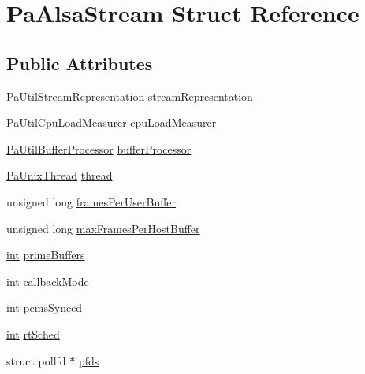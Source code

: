 \hypertarget{struct_pa_alsa_stream}{}\section{Pa\+Alsa\+Stream Struct Reference}
\label{struct_pa_alsa_stream}
\subsection*{Public Attributes}
\begin{DoxyCompactItemize}
\item 
\hyperlink{struct_pa_util_stream_representation}{Pa\+Util\+Stream\+Representation} \hyperlink{struct_pa_alsa_stream_addaeac8fe364c5ff592d34c51102490f}{stream\+Representation}
\item 
\hyperlink{struct_pa_util_cpu_load_measurer}{Pa\+Util\+Cpu\+Load\+Measurer} \hyperlink{struct_pa_alsa_stream_a29f7550cda202836040ec8d6dd0d6aea}{cpu\+Load\+Measurer}
\item 
\hyperlink{struct_pa_util_buffer_processor}{Pa\+Util\+Buffer\+Processor} \hyperlink{struct_pa_alsa_stream_acd44698cd6e3508f0d41c877ba5b436a}{buffer\+Processor}
\item 
\hyperlink{struct_pa_unix_thread}{Pa\+Unix\+Thread} \hyperlink{struct_pa_alsa_stream_a78a3ab135792aa210042183dabab28ca}{thread}
\item 
unsigned long \hyperlink{struct_pa_alsa_stream_a02214e72205abdc3e8cc0564c2e5a8e6}{frames\+Per\+User\+Buffer}
\item 
unsigned long \hyperlink{struct_pa_alsa_stream_a975c6b88b478a9408d81e84de435369f}{max\+Frames\+Per\+Host\+Buffer}
\item 
\hyperlink{xmltok_8h_a5a0d4a5641ce434f1d23533f2b2e6653}{int} \hyperlink{struct_pa_alsa_stream_a6977d63a92f8a3e044a8c6f5e1a2cc31}{prime\+Buffers}
\item 
\hyperlink{xmltok_8h_a5a0d4a5641ce434f1d23533f2b2e6653}{int} \hyperlink{struct_pa_alsa_stream_ad122ee597668cb143bc79be9712f382e}{callback\+Mode}
\item 
\hyperlink{xmltok_8h_a5a0d4a5641ce434f1d23533f2b2e6653}{int} \hyperlink{struct_pa_alsa_stream_a07464a14e43b11c9e5de064ed33fae70}{pcms\+Synced}
\item 
\hyperlink{xmltok_8h_a5a0d4a5641ce434f1d23533f2b2e6653}{int} \hyperlink{struct_pa_alsa_stream_a950d643d1442448a51072e83debc40be}{rt\+Sched}
\item 
struct pollfd $\ast$ \hyperlink{struct_pa_alsa_stream_aa2e24a0415a19cf1e2f95dd69af76e4c}{pfds}

\end{DoxyCompactItemize}
